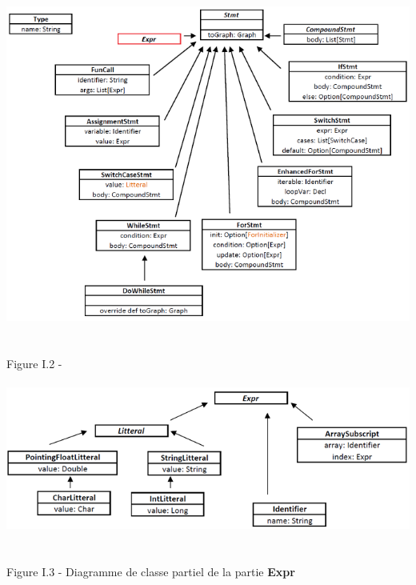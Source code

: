 \documentclass{report}
\begin{document}
\begin{center}
\includegraphics[scale=0.9]{data/stmt.png}
~\\~\\Figure I.2 - 
\end{center}

\paragraph{}
\hspace{4mm}\textnormal{}

\begin{center}
\includegraphics[scale=0.9]{data/expr1.png}
~\\~\\Figure I.3 - Diagramme de classe partiel de la partie \textbf{Expr}
\end{center}

\paragraph{}
\hspace{4mm}\textnormal{}
\end{document}
